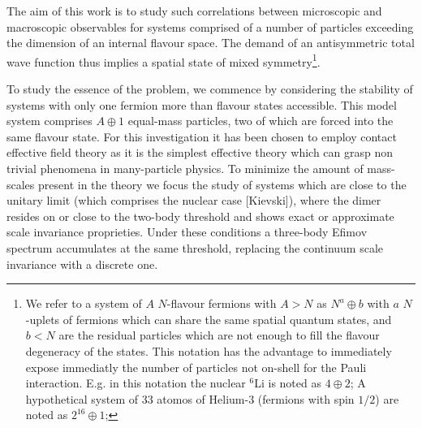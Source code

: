 \documentclass[preprint,12pt]{elsarticle}
\newcommand{\etc}{\textit{etc.}~}
\newcommand{\eg}{\textit{e.g.}~}
\newcommand{\ie}{\textit{i.e.}~}
\begin{document}
The aim of this work is to study such correlations between microscopic and macroscopic observables for systems comprised of
a number of particles exceeding the dimension of an internal flavour space.
The demand of an antisymmetric total wave function thus implies
a spatial state of mixed symmetry\footnote{We refer to a system of $A$ $N$-flavour fermions with $A>N$
as $N^a \oplus b$ with $a$ $N$-uplets of fermions which can share the same spatial quantum states, and $b<N$ are the residual
particles which are not enough to fill the flavour degeneracy of the states.
This notation has the advantage to immediately expose immediatly the number of particles not on-shell for the Pauli interaction.
E.g. in this notation the nuclear $^6$Li is noted as $4 \oplus 2$; A hypothetical system of 33 atomos of Helium-3 (fermions with spin $1/2$) are noted as $2^{16} \oplus 1$;}.

To study the essence of the problem, we commence by considering the stability of systems with only one fermion more than flavour states accessible.
This model system comprises $A\oplus1$ equal-mass particles, two of which are forced into the same flavour state.
For this investigation it has been chosen to employ contact effective field theory as it is the simplest effective theory which can grasp non trivial phenomena in many-particle physics.
To minimize the amount of mass-scales present in the theory we focus the study of systems which are close to the unitary limit (which comprises the nuclear case [Kievski]), where the dimer resides on or close to the two-body threshold and shows exact or approximate scale invariance proprieties.
Under these conditions a three-body Efimov spectrum accumulates at the same threshold, replacing the continuum scale invariance with a discrete one.
\end{document}
